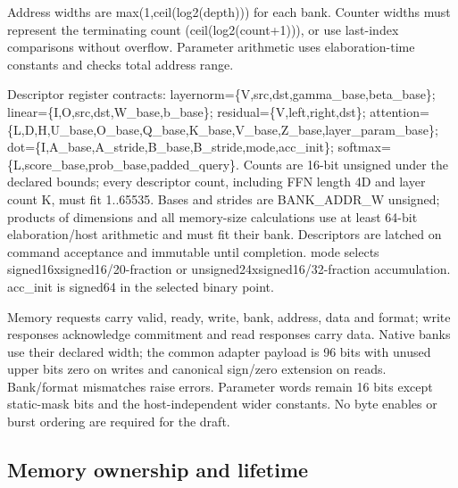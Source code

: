\documentclass[11pt,a4paper]{article}
\begin{document}
Address widths are max(1,ceil(log2(depth))) for each bank. Counter widths must represent the terminating count (ceil(log2(count+1))), or use last-index comparisons without overflow. Parameter arithmetic uses elaboration-time constants and checks total address range.

Descriptor register contracts: layernorm=\{V,src,dst,gamma\_base,beta\_base\}; linear=\{I,O,src,dst,W\_base,b\_base\}; residual=\{V,left,right,dst\}; attention=\{L,D,H,U\_base,O\_base,Q\_base,K\_base,V\_base,Z\_base,layer\_param\_base\}; dot=\{I,A\_base,A\_stride,B\_base,B\_stride,mode,acc\_init\}; softmax=\{L,score\_base,prob\_base,padded\_query\}. Counts are 16-bit unsigned under the declared bounds; every descriptor count, including FFN length 4D and layer count K, must fit 1..65535. Bases and strides are BANK\_ADDR\_W unsigned; products of dimensions and all memory-size calculations use at least 64-bit elaboration/host arithmetic and must fit their bank. Descriptors are latched on command acceptance and immutable until completion. mode selects signed16xsigned16/20-fraction or unsigned24xsigned16/32-fraction accumulation. acc\_init is signed64 in the selected binary point.

Memory requests carry valid, ready, write, bank, address, data and format; write responses acknowledge commitment and read responses carry data. Native banks use their declared width; the common adapter payload is 96 bits with unused upper bits zero on writes and canonical sign/zero extension on reads. Bank/format mismatches raise errors. Parameter words remain 16 bits except static-mask bits and the host-independent wider constants. No byte enables or burst ordering are required for the draft.

\subsection{Memory ownership and lifetime}
\end{document}
